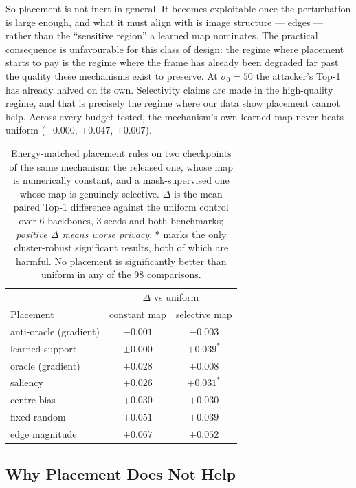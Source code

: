 \documentclass[10pt,journal]{IEEEtran}
\begin{document}
So placement is not inert in general. It becomes exploitable once the
perturbation is large enough, and what it must align with is image structure
--- edges --- rather than the ``sensitive region'' a learned map nominates.
The practical consequence is unfavourable for this class of design: the regime
where placement starts to pay is the regime where the frame has already been
degraded far past the quality these mechanisms exist to preserve. At
$\sigma_0=50$ the attacker's Top-1 has already halved on its own. Selectivity
claims are made in the high-quality regime, and that is precisely the regime
where our data show placement cannot help. Across every budget tested, the
mechanism's own learned map never beats uniform ($\pm0.000$, $+0.047$,
$+0.007$).

\begin{table}[t]
\centering
\caption{Energy-matched placement rules on two checkpoints of the same mechanism: the released one, whose map is numerically constant, and a mask-supervised one whose map is genuinely selective. $\Delta$ is the mean paired Top-1 difference against the uniform control over 6 backbones, 3 seeds and both benchmarks; \emph{positive $\Delta$ means worse privacy}. $\ast$ marks the only cluster-robust significant results, both of which are harmful. No placement is significantly better than uniform in any of the 98 comparisons.}
\label{tab:placement}
\begin{tabular}{lcc}
\hline
 & \multicolumn{2}{c}{$\Delta$ vs uniform} \\
Placement & constant map & selective map \\
\hline
anti-oracle (gradient) & $-0.001$ & $-0.003$ \\
learned support        & $\pm0.000$ & $+0.039^{\ast}$ \\
oracle (gradient)      & $+0.028$ & $+0.008$ \\
saliency               & $+0.026$ & $+0.031^{\ast}$ \\
centre bias            & $+0.030$ & $+0.030$ \\
fixed random           & $+0.051$ & $+0.039$ \\
edge magnitude         & $+0.067$ & $+0.052$ \\
\hline
\end{tabular}
\end{table}

\subsection{Why Placement Does Not Help}
\label{sec:mechanism}
\end{document}
